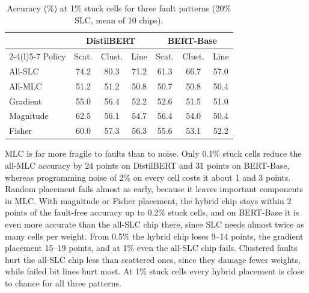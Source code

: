 \documentclass[conference]{IEEEtran}
\begin{document}
\begin{table}[t]
\caption{Accuracy (\%) at 1\% stuck cells for three fault patterns (20\% SLC, mean of 10 chips).}
\label{tab:pattern}
\centering
\small
\begin{tabular}{@{}lcccccc@{}}
\toprule
 & \multicolumn{3}{c}{\textbf{DistilBERT}} & \multicolumn{3}{c}{\textbf{BERT-Base}} \\
\cmidrule(lr){2-4}\cmidrule(l){5-7}
Policy & Scat. & Clust. & Line & Scat. & Clust. & Line \\
\midrule
All-SLC   & 74.2 & 80.3 & 71.2 & 61.3 & 66.7 & 57.0 \\
All-MLC   & 51.2 & 51.2 & 50.8 & 50.7 & 50.8 & 50.4 \\
Gradient  & 55.0 & 56.4 & 52.2 & 52.6 & 51.5 & 51.0 \\
Magnitude & 62.5 & 56.1 & 54.7 & 56.4 & 54.0 & 50.4 \\
Fisher    & 60.0 & 57.3 & 56.3 & 55.6 & 53.1 & 52.2 \\
\bottomrule
\end{tabular}
\end{table}

MLC is far more fragile to faults than to noise. Only 0.1\% stuck cells reduce the all-MLC accuracy by 24
points on DistilBERT and 31 points on BERT-Base, whereas programming noise of 2\% on every cell costs it
about 1 and 3 points. Random placement fails almost as early, because it leaves important components in MLC.
With magnitude or Fisher placement, the hybrid chip stays within 2 points of the fault-free accuracy up to
0.2\% stuck cells, and on BERT-Base it is even more accurate than the all-SLC chip there, since SLC needs
almost twice as many cells per weight. From 0.5\% the hybrid chip loses 9--14 points, the gradient
placement 15--19 points, and at 1\% even the all-SLC chip fails. Clustered faults hurt the all-SLC chip less
than scattered ones, since they damage fewer weights, while failed bit lines hurt most. At 1\% stuck cells
every hybrid placement is close to chance for all three patterns.
\end{document}
